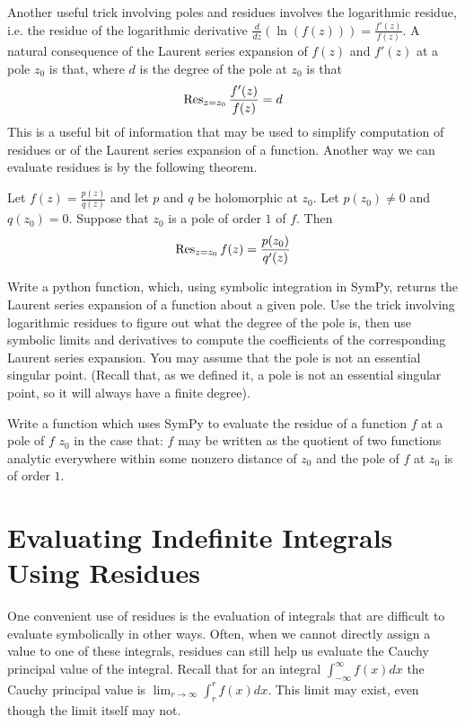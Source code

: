 Another useful trick involving poles and residues involves the logarithmic residue, i.e. the residue of the logarithmic derivative $\frac{d}{dz}(\ln(f(z))) = \frac{f'(z)}{f(z)}$.
A natural consequence of the Laurent series expansion of $f(z)$ and $f'(z)$ at a pole $z_0$ is that, where $d$ is the degree of the pole at $z_0$ is that
\begin{equation*}
\operatorname{Res}_{z=z_0} \frac{f'(z)}{f(z)} = d
\end{equation*}
This is a useful bit of information that may be used to simplify computation of residues or of the Laurent series expansion of a function. 
Another way we can evaluate residues is by the following theorem.
\begin{theorem}
Let $f(z)=\frac{p(z)}{q(z)}$ and let $p$ and $q$ be holomorphic at $z_0$. Let $p(z_0) \neq 0$ and $q(z_0)=0$. Suppose that $z_0$ is a pole of order $1$ of $f$. Then 
\begin{equation*}
\operatorname{Res}_{z=z_0} f(z) = \frac{p(z_0)}{q'(z)}
\end{equation*}
\end{theorem}

\begin{problem}
Write a python function, which, using symbolic integration in SymPy, returns the Laurent series expansion of a function about a given pole.
Use the trick involving logarithmic residues to figure out what the degree of the pole is, then use symbolic limits and derivatives to compute the coefficients of the corresponding Laurent series expansion.
You may assume that the pole is not an essential singular point.
(Recall that, as we defined it, a pole is not an essential singular point, so it will always have a finite degree).
\end{problem}

\begin{problem}
Write a function which uses SymPy to evaluate the residue of a function $f$ at a pole of $f$ $z_0$ in the case that: $f$ may be written as the quotient of two functions analytic everywhere within some nonzero distance of $z_0$ and the pole of $f$ at $z_0$ is of order $1$.
\end{problem}

\section*{Evaluating Indefinite Integrals Using Residues}

One convenient use of residues is the evaluation of integrals that are difficult to evaluate symbolically in other ways.
Often, when we cannot directly assign a value to one of these integrals, residues can still help us evaluate the Cauchy principal value of the integral.
Recall that for an integral $\int_{-\infty}^{\infty} f(x)dx$ the Cauchy principal value is $\lim_{r\to \infty} \int_{r}^{r} f(x) dx$. This limit may exist, even though the limit itself may not.

